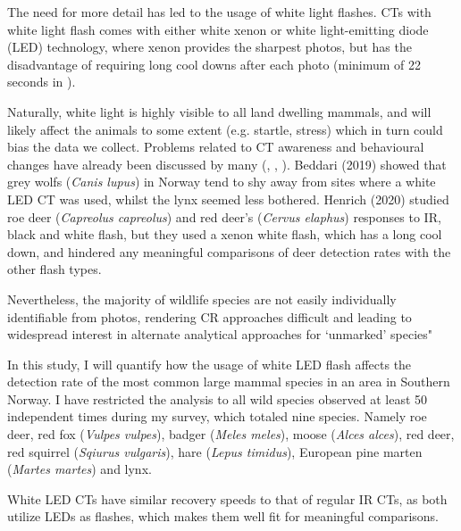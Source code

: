 The need for more detail has led to the usage of white light flashes.
CTs with white light flash comes with either white xenon or white light-emitting diode (LED) technology, where xenon provides the sharpest photos, but has the disadvantage of requiring long cool downs after each photo (minimum of 22 seconds %
in \cite{Henrich2020}).

Naturally, white light is highly visible to all land dwelling mammals, and will likely affect the animals to some extent (e.g. startle, stress) which in turn could bias the data we collect. Problems related to CT awareness and behavioural changes have already been discussed by many (\cite{Meek2014}, \cite{Burton2015}, \cite{Hofmeester2019}). %
Beddari (2019) showed that grey wolfs (\textit{Canis lupus}) in Norway tend to shy away from sites where a white LED CT was used, whilst the  lynx  seemed less bothered. %
Henrich (2020) studied roe deer (\textit{Capreolus capreolus}) and red deer's (\textit{Cervus elaphus}) responses to IR, black and white flash, but they used a xenon white flash, which has a long cool down, and hindered any meaningful comparisons of deer detection rates with the other flash types.

\cite{}

%
Nevertheless, the majority of wildlife species are not easily individually identifiable from photos, rendering CR approaches difficult and leading to widespread interest in alternate analytical approaches for ‘unmarked’ species" \cite{Burton2015} %



In this study, I will quantify how the usage of white LED flash affects the detection rate of the most common large mammal species in an area in Southern Norway.
I have restricted the analysis to all wild species observed at least 50 independent times during my survey, which totaled nine species.
Namely roe deer, red fox (\textit{Vulpes vulpes}), badger (\textit{Meles meles}), moose (\textit{Alces alces}), red deer, red squirrel (\textit{Sqiurus vulgaris}), hare (\textit{Lepus timidus}), European pine marten (\textit{Martes martes}) and lynx. 

White LED CTs have similar recovery speeds to that of regular IR CTs, as both utilize LEDs as flashes, which makes them well fit for meaningful comparisons.

